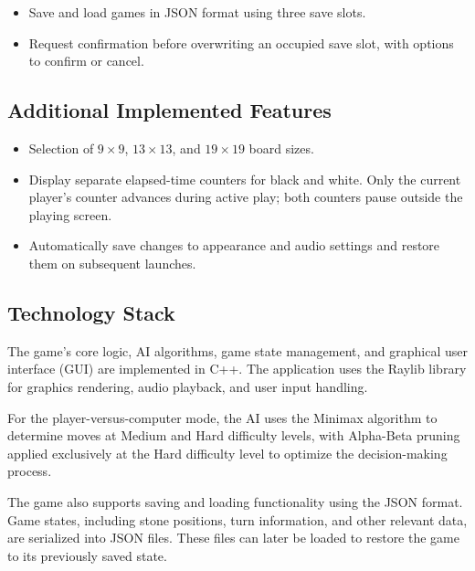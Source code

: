 \begin{itemize}
    \item Save and load games in JSON format using three save slots.
    \item Request confirmation before overwriting an occupied save slot, with options to confirm or cancel.
\end{itemize}

\subsection{Additional Implemented Features}

\begin{itemize}
    \item Selection of $9 \times 9$, $13 \times 13$, and $19 \times 19$ board sizes.
    \item Display separate elapsed-time counters for black and white. Only the current player's counter advances during active play; both counters pause outside the playing screen.
    \item Automatically save changes to appearance and audio settings and restore them on subsequent launches.
\end{itemize}

\subsection{Technology Stack}

The game's core logic, AI algorithms, game state management, and graphical user interface (GUI) are implemented in C++. The application uses the Raylib library for graphics rendering, audio playback, and user input handling.

For the player-versus-computer mode, the AI uses the Minimax algorithm to determine moves at Medium and Hard difficulty levels, with Alpha-Beta pruning applied exclusively at the Hard difficulty level to optimize the decision-making process.

The game also supports saving and loading functionality using the JSON format. Game states, including stone positions, turn information, and other relevant data, are serialized into JSON files. These files can later be loaded to restore the game to its previously saved state.
